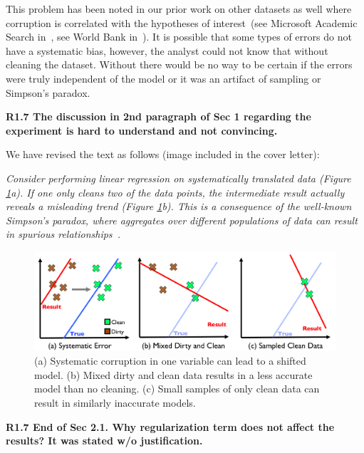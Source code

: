 This problem has been noted in our prior work on other datasets as well where corruption is correlated with the hypotheses of interest~(see Microsoft Academic Search in~\cite{wang1999sample}, see World Bank in~\cite{activecleanarxiv}). It is possible that some types of errors do not have a systematic bias, however, the analyst could not know that without cleaning the dataset.
Without \sys there would be no way to be certain if the errors were truly independent of the model or it was an artifact of sampling or Simpson's paradox.

\vspace{0.5em}

\noindent\textbf{R1.7 The discussion in 2nd paragraph of Sec 1 regarding the experiment is hard to understand and not convincing.}

\noindent We have revised the text as follows (image included in the cover letter):

\emph{Consider performing linear regression on systematically translated data (Figure \ref{update-arch-coverletter}a).
If one only cleans two of the data points, the intermediate result actually reveals a misleading trend (Figure \ref{update-arch-coverletter}b).
This is a consequence of the well-known Simpson's paradox, where aggregates over different populations of data can result in spurious relationships~\cite{simpson1951interpretation}.}

\begin{figure}[ht!]
\centering
 \includegraphics[width=\columnwidth]{figs/update-arch.png}
 \caption{(a) Systematic corruption in one variable can lead to a shifted model. 
 (b) Mixed dirty and clean data results in a less accurate model than no cleaning.
(c) Small samples of only clean data can result in similarly inaccurate models. \label{update-arch-coverletter}}
\end{figure}

\vspace{0.5em}

\noindent\textbf{R1.7 End of Sec 2.1. Why regularization term does not affect the results? It was stated w/o justification.}

